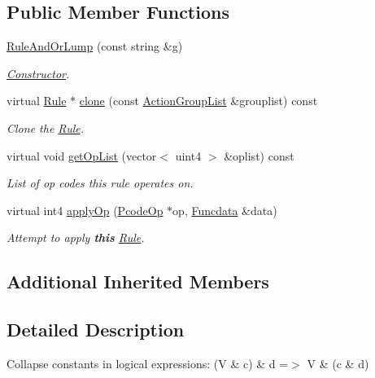 \subsection*{Public Member Functions}
\begin{DoxyCompactItemize}
\item 
\mbox{\hyperlink{class_rule_and_or_lump_a4515fe1d4cbd72366b5e757da8afa5b9}{Rule\+And\+Or\+Lump}} (const string \&g)
\begin{DoxyCompactList}\small\item\em \mbox{\hyperlink{class_constructor}{Constructor}}. \end{DoxyCompactList}\item 
virtual \mbox{\hyperlink{class_rule}{Rule}} $\ast$ \mbox{\hyperlink{class_rule_and_or_lump_a6ca08216a9a64058fae83a1718a67301}{clone}} (const \mbox{\hyperlink{class_action_group_list}{Action\+Group\+List}} \&grouplist) const
\begin{DoxyCompactList}\small\item\em Clone the \mbox{\hyperlink{class_rule}{Rule}}. \end{DoxyCompactList}\item 
virtual void \mbox{\hyperlink{class_rule_and_or_lump_aa40ff67a44e672e88dbb6485309a482f}{get\+Op\+List}} (vector$<$ uint4 $>$ \&oplist) const
\begin{DoxyCompactList}\small\item\em List of op codes this rule operates on. \end{DoxyCompactList}\item 
virtual int4 \mbox{\hyperlink{class_rule_and_or_lump_aff7dd54db4bd5474329200371c8a3146}{apply\+Op}} (\mbox{\hyperlink{class_pcode_op}{Pcode\+Op}} $\ast$op, \mbox{\hyperlink{class_funcdata}{Funcdata}} \&data)
\begin{DoxyCompactList}\small\item\em Attempt to apply {\bfseries{this}} \mbox{\hyperlink{class_rule}{Rule}}. \end{DoxyCompactList}\end{DoxyCompactItemize}
\subsection*{Additional Inherited Members}


\subsection{Detailed Description}
Collapse constants in logical expressions\+: {\ttfamily (V \& c) \& d =$>$ V \& (c \& d)} 

